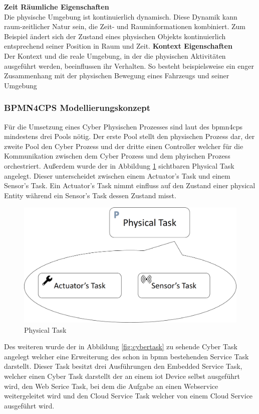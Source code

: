 \documentclass[a4paper, 12pt, twoside, headsepline=true]{scrartcl} %
\begin{document}
\newline
\textbf{Zeit Räumliche Eigenschaften}
\\
Die physische Umgebung ist kontinuierlich dynamisch. Diese Dynamik kann raum-zeitlicher Natur sein, die Zeit- und Rauminformationen kombiniert. Zum Beispiel ändert sich der Zustand eines physischen Objekts kontinuierlich entsprechend seiner Position in Raum und Zeit.
\newline
\textbf{Kontext Eigenschaften}
\\
Der Kontext und die reale Umgebung, in der die physischen Aktivitäten ausgeführt werden, beeinflussen ihr Verhalten. So besteht beispielsweise ein enger Zusammenhang mit der physischen Bewegung eines Fahrzeugs und seiner Umgebung 

\subsubsection{BPMN4CPS Modellierungskonzept}

Für die Umsetzung eines Cyber Physischen Prozesses sind laut des \ac{bpmn4cps} mindestens drei Pools nötig. Der erste Pool stellt den physischen Prozess dar, der zweite Pool den Cyber Prozess und der dritte einen Controller welcher für die Kommunikation zwischen dem Cyber Prozess und dem phyischen Prozess orchestriert. Außerdem wurde der in Abbildung \ref{fig:physicaltask} sichtbaren Physical Task  angelegt. Dieser unterscheidet zwischen einem Actuator's Task und einem Sensor's Task. Ein Actuator's Task nimmt einfluss auf den Zustand einer physical Entity während ein Sensor's Task dessen Zustand misst.

\begin{figure}[H]
	\includegraphics[height=4 cm,keepaspectratio,center]{figures/PhysicalTask}
	\caption{Physical Task\cite{BMPN4CPS}}
	\label{fig:physicaltask}
\end{figure} 

Des weiteren wurde der in Abbildung \ref{fig:cybertask} zu sehende Cyber Task angelegt welcher eine Erweiterung des schon in \ac{bpmn} bestehenden Service Task darstellt. Dieser Task besitzt drei Ausführungen den Embedded Service Task, welcher einen Cyber Task darstellt der an einem \ac{iot} Device selbst ausgeführt wird, den Web Serice Task, bei dem die Aufgabe an einen Webservice weitergeleitet wird und den Cloud Service Task welcher von einem Cloud Service ausgeführt wird.  
\end{document}
